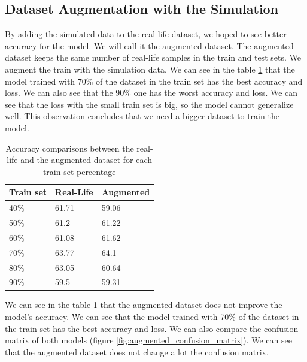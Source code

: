 \subsection{Dataset Augmentation with the Simulation}
\label{sec:augmentation_results}

By adding the simulated data to the real-life dataset, we hoped to see better accuracy for the model. We will call it the augmented dataset. The augmented dataset keeps the same number of real-life samples in the train and test sets. We augment the train with the simulation data. We can see in the table \ref{tab:neural_network__augmented_results} that the model trained with 70\% of the dataset in the train set has the best accuracy and loss. We can also see that the 90\% one has the worst accuracy and loss. We can see that the loss with the small train set is big, so the model cannot generalize well. This observation concludes that we need a bigger dataset to train the model.

\begin{table}[H]
    \centering
    \begin{tabular}{|l|l|l|}
    \hline
    \textbf{Train set} & \textbf{Real-Life} & \textbf{Augmented} \\ \hline
    40\%               & 61.71              & 59.06         \\ \hline
    50\%               & 61.2               & 61.22         \\ \hline
    60\%               & 61.08              & 61.62         \\ \hline
    70\%               & 63.77              & 64.1          \\ \hline
    80\%               & 63.05              & 60.64         \\ \hline
    90\%               & 59.5               & 59.31         \\ \hline
    \end{tabular}
    \caption{Accuracy comparisons between the real-life and the augmented dataset for each train set percentage}
    \label{tab:neural_network__augmented_results}
\end{table}

We can see in the table \ref{tab:neural_network__augmented_results} that the augmented dataset does not improve the model's accuracy. We can see that the model trained with 70\% of the dataset in the train set has the best accuracy and loss. We can also compare the confusion matrix of both models (figure \ref{fig:augmented_confusion_matrix}). We can see that the augmented dataset does not change a lot the confusion matrix.

